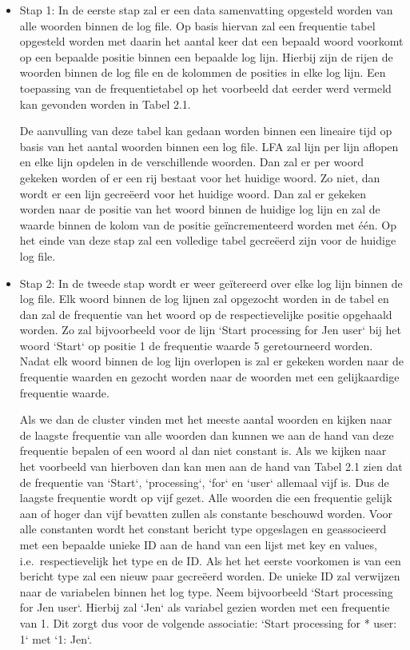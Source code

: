 \begin{itemize}
    \item Stap 1: In de eerste stap zal er een data samenvatting opgesteld worden van alle woorden binnen de log file. Op basis hiervan zal een frequentie tabel opgesteld worden met daarin het aantal keer dat een bepaald woord voorkomt op een bepaalde positie binnen een bepaalde log lijn. Hierbij zijn de rijen de woorden binnen de log file en de kolommen de posities in elke log lijn. Een toepassing van de frequentietabel op het voorbeeld dat eerder werd vermeld kan gevonden worden in Tabel 2.1. 
    
    De aanvulling van deze tabel kan gedaan worden binnen een lineaire tijd op basis van het aantal woorden binnen een log file. LFA zal lijn per lijn aflopen en elke lijn opdelen in de verschillende woorden. Dan zal er per woord gekeken worden of er een rij bestaat voor het huidige woord. Zo niet, dan wordt er een lijn gecreëerd voor het huidige woord. Dan zal er gekeken worden naar de positie van het woord binnen de huidige log lijn en zal de waarde binnen de kolom van de positie geïncrementeerd worden met één. Op het einde van deze stap zal een volledige tabel gecreëerd zijn voor de huidige log file.\\
    \item Stap 2: In de tweede stap wordt er weer geïtereerd over elke log lijn binnen de log file. Elk woord binnen de log lijnen zal opgezocht worden in de tabel en dan zal de frequentie van het woord op de respectievelijke positie opgehaald worden. Zo zal bijvoorbeeld voor de lijn `Start processing for Jen user` bij het woord `Start` op positie 1 de frequentie waarde 5 geretourneerd worden. Nadat elk woord binnen de log lijn overlopen is zal er gekeken worden naar de frequentie waarden en gezocht worden naar de woorden met een gelijkaardige frequentie waarde. 
    
    Als we dan de cluster vinden met het meeste aantal woorden en kijken naar de laagste frequentie van alle woorden dan kunnen we aan de hand van deze frequentie bepalen of een woord al dan niet constant is. Als we kijken naar het voorbeeld van hierboven dan kan men aan de hand van Tabel 2.1 zien dat de frequentie van `Start`, `processing`, `for` en `user` allemaal vijf is. Dus de laagste frequentie wordt op vijf gezet. Alle woorden die een frequentie gelijk aan of hoger dan vijf bevatten zullen als constante beschouwd worden. Voor alle constanten wordt het constant bericht type opgeslagen en geassocieerd met een bepaalde unieke ID aan de hand van een lijst met key en values, i.e.\ respectievelijk het type en de ID. Als het het eerste voorkomen is van een bericht type zal een nieuw paar gecreëerd worden. De unieke ID zal verwijzen naar de variabelen binnen het log type. Neem bijvoorbeeld `Start processing for Jen user`. Hierbij zal `Jen` als variabel gezien worden met een frequentie van 1. Dit zorgt dus voor de volgende associatie: `Start processing for * user: 1` met `1: Jen`.
\end{itemize}


